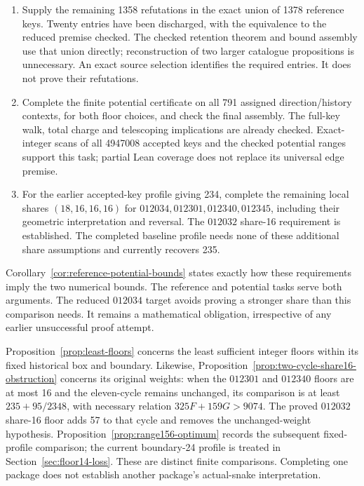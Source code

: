\documentclass[11pt,a4paper]{article}
\theoremstyle{definition}
\theoremstyle{remark}
\begin{document}
\begin{enumerate}
\item Supply the remaining 1358 refutations in the exact union of 1378
reference keys. Twenty entries have been discharged, with the equivalence
to the reduced premise checked. The checked retention theorem and bound assembly use that
union directly; reconstruction of two larger catalogue propositions is
unnecessary. An exact source selection identifies the required entries.
It does not prove their refutations.
\item Complete the finite potential certificate on all 791 assigned
direction/history contexts, for both floor choices, and check the final
assembly. The full-key walk, total charge and telescoping implications
are already checked. Exact-integer scans of all 4947008 accepted keys and
the checked potential ranges support this task; partial Lean coverage
does not replace its universal edge premise.
\item For the earlier accepted-key profile giving 234, complete the remaining local shares
$(18,16,16,16)$ for $012034,012301,012340,012345$, including
their geometric interpretation and reversal. The $012032$ share-16
requirement is established. The completed baseline profile needs none
of these additional share assumptions and currently recovers 235.
\end{enumerate}

Corollary~\ref{cor:reference-potential-bounds} states exactly how these
requirements imply the two numerical bounds. The reference and potential
tasks serve both arguments. The reduced $012034$ target avoids proving a
stronger share than this comparison needs. It remains a mathematical
obligation, irrespective of any earlier unsuccessful proof attempt.

Proposition~\ref{prop:least-floors} concerns the least sufficient integer
floors within its fixed historical box and boundary. Likewise,
Proposition~\ref{prop:two-cycle-share16-obstruction} concerns its original
weights: when the $012301$ and $012340$ floors are at most 16 and the
eleven-cycle remains unchanged, its comparison is at least
$235+95/2348$, with necessary relation $325F+159G>9074$.
The proved $012032$ share-16 floor adds 57 to that cycle and removes
the unchanged-weight hypothesis. Proposition~\ref{prop:range156-optimum}
records the subsequent fixed-profile comparison; the current
boundary-24 profile is treated in Section~\ref{sec:floor14-loss}.
These are distinct finite comparisons. Completing one package does not
establish another package's actual-snake interpretation.
\end{document}
